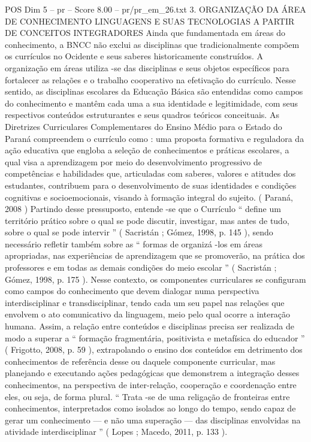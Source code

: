 \begin{textsample}{POS Dim 5 – pr – Score 8.00 – pr/pr\_em\_26.txt}  \label{ex:f5_pos_058}
3.
ORGANIZAÇÃO DA ÁREA DE CONHECIMENTO LINGUAGENS E SUAS TECNOLOGIAS A PARTIR DE CONCEITOS INTEGRADORES Ainda que fundamentada em áreas do conhecimento, a BNCC não exclui as disciplinas que tradicionalmente compõem os currículos no Ocidente e seus saberes historicamente construídos.
A organização em áreas utiliza -se das disciplinas e seus objetos específicos para fortalecer as relações e o trabalho cooperativo na efetivação do currículo.
Nesse sentido, as disciplinas escolares da Educação Básica são entendidas como campos do conhecimento e mantêm cada uma a sua identidade e legitimidade, com seus respectivos conteúdos estruturantes e seus quadros teóricos conceituais.
As Diretrizes Curriculares Complementares do Ensino Médio para o Estado do Paraná compreendem o currículo como : uma proposta formativa e reguladora da ação educativa que engloba a seleção de conhecimentos e práticas escolares, a qual visa a aprendizagem por meio do desenvolvimento progressivo de competências e habilidades que, articuladas com saberes, valores e atitudes dos estudantes, contribuem para o desenvolvimento de suas identidades e condições cognitivas e socioemocionais, visando à formação integral do sujeito. ( Paraná, 2008 ) Partindo desse pressuposto, entende -se que o Currículo “ define um território prático sobre o qual se pode discutir, investigar, mas antes de tudo, sobre o qual se pode intervir ” ( Sacristán ; Gómez, 1998, p. 145 ), sendo necessário refletir também sobre as “ formas de organizá -los em áreas apropriadas, nas experiências de aprendizagem que se promoverão, na prática dos professores e em todas as demais condições do meio escolar ” ( Sacristán ; Gómez, 1998, p. 175 ).
Nesse contexto, os componentes curriculares se configuram como campos do conhecimento que devem dialogar numa perspectiva interdisciplinar e transdisciplinar, tendo cada um seu papel nas relações que envolvem o ato comunicativo da linguagem, meio pelo qual ocorre a interação humana.
Assim, a relação entre conteúdos e disciplinas precisa ser realizada de modo a superar a “ formação fragmentária, positivista e metafísica do educador ” ( Frigotto, 2008, p. 59 ), extrapolando o ensino dos conteúdos em detrimento dos conhecimentos de referência desse ou daquele componente curricular, mas planejando e executando ações pedagógicas que demonstrem a integração desses conhecimentos, na perspectiva de inter-relação, cooperação e coordenação entre eles, ou seja, de forma plural. “ Trata -se de uma religação de fronteiras entre conhecimentos, interpretados como isolados ao longo do tempo, sendo capaz de gerar um conhecimento — e não uma superação — das disciplinas envolvidas na atividade interdisciplinar ” ( Lopes ; Macedo, 2011, p. 133 ).

\end{textsample}
